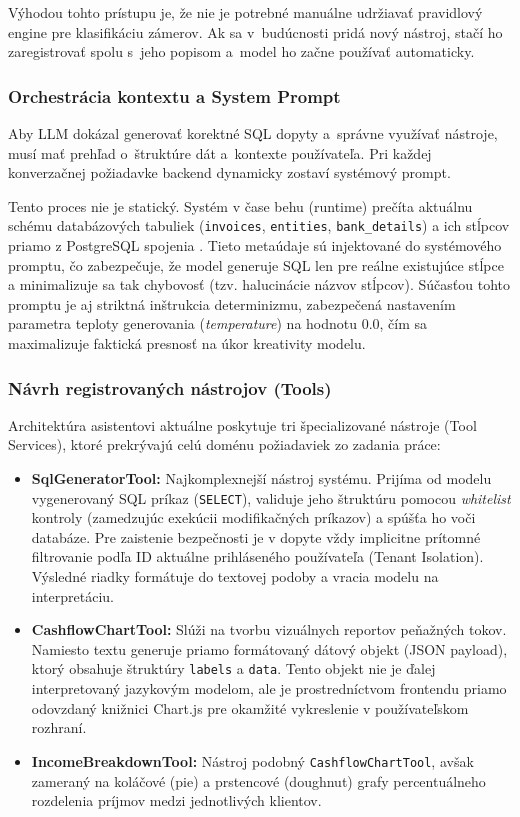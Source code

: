 Výhodou tohto prístupu je, že nie je potrebné manuálne udržiavať pravidlový
engine pre klasifikáciu zámerov. Ak sa v~budúcnosti pridá nový nástroj, stačí ho
zaregistrovať spolu s~jeho popisom a~model ho začne používať automaticky.

\subsubsection{Orchestrácia kontextu a System Prompt}

Aby LLM dokázal generovať korektné SQL dopyty a~správne využívať nástroje, musí
mať prehľad o~štruktúre dát a~kontexte používateľa. Pri každej konverzačnej požiadavke
backend dynamicky zostaví systémový prompt.

Tento proces nie je statický. Systém v čase behu (runtime) prečíta aktuálnu
schému databázových tabuliek (\texttt{invoices}, \texttt{entities}, \texttt{bank\_details})
a ich stĺpcov priamo z PostgreSQL spojenia \cite{ruby2025}. Tieto metaúdaje sú
injektované do systémového promptu, čo zabezpečuje, že model generuje SQL len
pre reálne existujúce stĺpce a minimalizuje sa tak chybovosť (tzv. halucinácie
názvov stĺpcov). Súčasťou tohto promptu je aj striktná inštrukcia determinizmu, zabezpečená
nastavením parametra teploty generovania (\textit{temperature}) na hodnotu 0.0, čím
sa maximalizuje faktická presnosť na úkor kreativity modelu.

\subsubsection{Návrh registrovaných nástrojov (Tools)}

Architektúra asistentovi aktuálne poskytuje tri špecializované nástroje (Tool Services),
ktoré prekrývajú celú doménu požiadaviek zo zadania práce:

\begin{itemize}
	\item \textbf{SqlGeneratorTool:} Najkomplexnejší nástroj systému. Prijíma od modelu
		vygenerovaný SQL príkaz (\texttt{SELECT}), validuje jeho štruktúru pomocou \textit{whitelist}
		kontroly (zamedzujúc exekúcii modifikačných príkazov) a spúšťa ho voči
		databáze. Pre zaistenie bezpečnosti je v dopyte vždy implicitne prítomné filtrovanie
		podľa ID aktuálne prihláseného používateľa (Tenant Isolation). Výsledné
		riadky formátuje do textovej podoby a vracia modelu na interpretáciu.

	\item \textbf{CashflowChartTool:} Slúži na tvorbu vizuálnych reportov
		peňažných tokov. Namiesto textu generuje priamo formátovaný dátový objekt (JSON
		payload), ktorý obsahuje štruktúry \texttt{labels} a \texttt{data}. Tento objekt
		nie je ďalej interpretovaný jazykovým modelom, ale je prostredníctvom
		frontendu priamo odovzdaný knižnici Chart.js pre okamžité vykreslenie v
		používateľskom rozhraní.

	\item \textbf{IncomeBreakdownTool:} Nástroj podobný \texttt{CashflowChartTool},
		avšak zameraný na koláčové (pie) a prstencové (doughnut) grafy
		percentuálneho rozdelenia príjmov medzi jednotlivých klientov.
\end{itemize}

